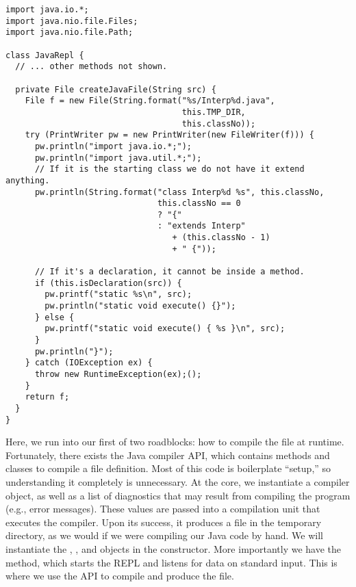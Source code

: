 \begin{lstlisting}[language=MyJava]
import java.io.*;
import java.nio.file.Files;
import java.nio.file.Path;

class JavaRepl {
  // ... other methods not shown.
  
  private File createJavaFile(String src) {
    File f = new File(String.format("%s/Interp%d.java",
                                    this.TMP_DIR, 
                                    this.classNo));
    try (PrintWriter pw = new PrintWriter(new FileWriter(f))) {
      pw.println("import java.io.*;");
      pw.println("import java.util.*;");
      // If it is the starting class we do not have it extend anything.
      pw.println(String.format("class Interp%d %s", this.classNo,
                               this.classNo == 0
                               ? "{" 
                               : "extends Interp" 
                                  + (this.classNo - 1) 
                                  + " {"));

      // If it's a declaration, it cannot be inside a method.
      if (this.isDeclaration(src)) {
        pw.printf("static %s\n", src);
        pw.println("static void execute() {}");
      } else {
        pw.printf("static void execute() { %s }\n", src);
      }
      pw.println("}");
    } catch (IOException ex) {
      throw new RuntimeException(ex);();
    }
    return f;
  }
}
\end{lstlisting}

Here, we run into our first of two roadblocks: how to compile the file at runtime. 
Fortunately, there exists the Java compiler API, which contains methods and classes to compile a file definition. 
Most of this code is boilerplate ``setup,'' so understanding it completely is unnecessary. 
At the core, we instantiate a compiler object, as well as a list of diagnostics that may result from compiling the program (e.g., error messages). 
These values are passed into a compilation unit that executes the compiler. 
Upon its success, it produces a  file in the temporary directory, as we would if we were compiling our Java code by hand. 
We will instantiate the , , and  objects in the constructor. 
More importantly we have the  method, which starts the REPL and listens for data on standard input. 
This is where we use the API to compile and produce the  file.   

